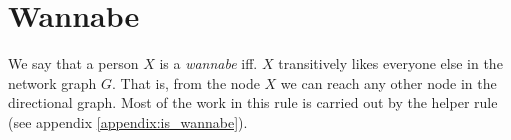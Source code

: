 %
%

\section{Wannabe}
We say that a person $X$ is a {\it wannabe} iff. $X$ transitively likes
everyone else in the network graph $G$. That is, from the node $X$ we can
reach any other node in the directional graph. Most of the work in this rule
is carried out by the helper rule  (see appendix
\ref{appendix:is_wannabe}).

